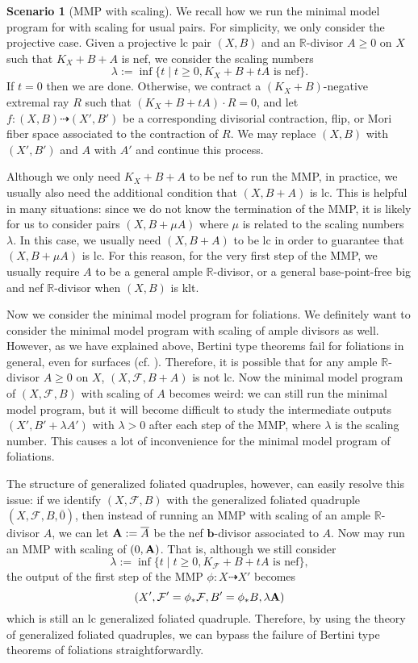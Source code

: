 \documentclass[11pt]{amsart}
\numberwithin{equation}{section}
\newcommand{\bb}{\bm{b}}
\newcommand{\Rr}{\mathbb{R}}
\newcommand{\Aa}{{\bf{A}}}
\newcommand{\Ff}{\mathcal{F}}
\theoremstyle{definition}
\theoremstyle{definition}
\newtheorem{sce}[thm]{Scenario}
\theoremstyle{definition}
\begin{document}
\begin{sce}[MMP with scaling]
We recall how we run the minimal model program for with scaling for usual pairs. For simplicity, we only consider the projective case. Given a projective lc pair $(X,B)$ and an  $\Rr$-divisor $A\geq 0$ on $X$ such that $K_X+B+A$ is nef, we consider the scaling numbers
$$\lambda:=\inf\{t\mid t\geq 0, K_X+B+tA\text{ is nef}\}.$$
If $t=0$ then we are done. Otherwise, we contract a $(K_X+B)$-negative extremal ray $R$ such that $(K_X+B+tA)\cdot R=0$, and let $f: (X,B)\dashrightarrow (X',B')$ be a corresponding divisorial contraction, flip, or Mori fiber space associated to the contraction of $R$. We may replace $(X,B)$ with $(X',B')$ and $A$ with $A'$ and continue this process.

Although we only need $K_X+B+A$ to be nef to run the MMP, in practice, we usually also need the additional condition that $(X,B+A)$ is lc. This is helpful in many situations: since we do not know the termination of the MMP, it is likely for us to consider pairs $(X,B+\mu A)$ where $\mu$ is related to the scaling numbers $\lambda$. In this case, we usually need $(X,B+A)$ to be lc in order to guarantee that $(X,B+\mu A)$ is lc. For this reason, for the very first step of the MMP, we usually require $A$ to be a general ample $\Rr$-divisor, or a general base-point-free big and nef $\Rr$-divisor when $(X,B)$ is klt.

Now we consider the minimal model program for foliations. We definitely want to consider the minimal model program with scaling of ample divisors as well. However, as we have explained above, Bertini type theorems fail for foliations in general, even for surfaces (cf. \cite[Example 3.4]{DLM23}). Therefore, it is possible that for any ample $\Rr$-divisor $A\geq 0$ on $X$, $(X,\Ff,B+A)$ is not lc. Now the minimal model program of $(X,\Ff,B)$ with scaling of $A$ becomes weird: we can still run the minimal model program, but it will become difficult to study the intermediate outputs $(X',B'+\lambda A')$ with $\lambda>0$ after each step of the MMP, where $\lambda$ is the scaling number. This causes a lot of inconvenience for the minimal model program of foliations.

The structure of generalized foliated quadruples, however, can easily resolve this issue: if we identify $(X,\Ff,B)$ with the generalized foliated quadruple $(X,\Ff,B,\overline{0})$, then instead of running an MMP with scaling of an ample $\Rr$-divisor $A$, we can let $\Aa:=\overline{A}$ be the nef $\bb$-divisor associated to $A$. Now may run an MMP with scaling of $(0,\Aa)$. That is, although we still consider
$$\lambda:=\inf\{t\mid t\geq 0, K_{\Ff}+B+tA\text{ is nef}\},$$
the output of the first step of the MMP $\phi: X\dashrightarrow X'$ becomes $$(X',\Ff'=\phi_*\Ff,B'=\phi_*B,\lambda\Aa)$$ which is still an lc generalized foliated quadruple. Therefore, by using the theory of generalized foliated quadruples, we can bypass the failure of Bertini type theorems of foliations straightforwardly.
\end{sce}
\end{document}
